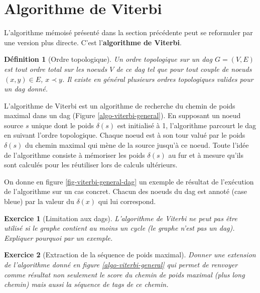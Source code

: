 \documentclass[11pt,openany]{book}
\newtheorem{definition}{Définition}[chapter]
\newtheorem{exo}{Exercice}[chapter]
\newcommand{\ac}[1]{{\sc #1}} %
\newcommand{\kw}[1]{{\bf #1}} %
\begin{document}
\section{Algorithme de Viterbi}
\label{sec-viterbi}

L'algorithme mémoisé présenté dans la section précédente peut se
reformuler par une version plus directe. C'est l'\kw{algorithme de Viterbi}.

\begin{definition}[Ordre topologique] Un ordre topologique sur un \ac{dag} $G=(V,E)$ est tout ordre total sur les noeuds $V$ de ce \ac{dag} tel que pour tout couple de noeuds $(x,y) \in E$,  $x \prec y$. Il existe en général plusieurs ordres topologiques valides pour un \ac{dag} donné.
\end{definition}

L'algorithme de Viterbi est un algorithme de recherche du chemin de
poids maximal dans un \ac{dag} (Figure \ref{algo-viterbi-general}). 
 En supposant un noeud source $s$ unique dont le poids $\delta(s)$ est
 initialisé à 1, l'algorithme parcourt le \ac{dag} en suivant l'ordre
 topologique. Chaque noeud est à son tour valué par le poids
 $\delta(s)$ du chemin maximal qui mène de la source jusqu'à ce
 noeud. Toute l'idée de l'algorithme consiste à mémoriser les poids
 $\delta(s)$ au fur et à mesure qu'ils sont calculés pour les
 réutiliser lors de calculs ultérieurs.

\begin{algorithm}[htbp]
\caption{\label{algo-viterbi-general}Algorithme de Viterbi}
\end{algorithm}

On donne en figure \ref{fig-viterbi-general-dag} un exemple de
résultat de l'exécution de l'algorithme sur un cas concret. Chacun des
noeuds du \ac{dag} est annoté (case bleue) par la valeur du $\delta(x)$
qui lui correspond.



\begin{exo}[Limitation aux \ac{dags}]
L'algorithme de Viterbi ne peut pas être utilisé si le graphe contient
au moins un cycle (le graphe n'est pas un \ac{dag}). Expliquer
pourquoi par un exemple.
\end{exo}
\begin{exo}[Extraction de la séquence de poids maximal]
Donner une extension de l'algorithme donné en figure
\ref{algo-viterbi-general} qui permet de renvoyer comme résultat non
seulement le score du chemin de poids maximal (plus long chemin) mais
aussi la séquence de tags de ce chemin.
\end{exo}
\end{document}
